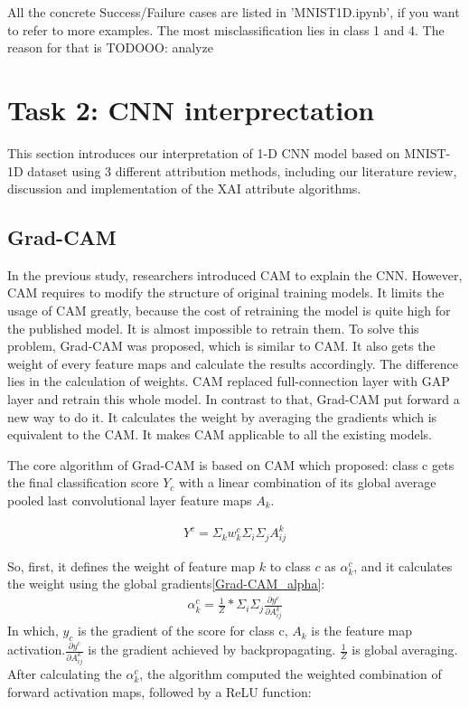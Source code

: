 \documentclass[conference]{IEEEtran}
\begin{document}
All the concrete Success/Failure cases are listed in 'MNIST1D.ipynb', if you want to refer to more examples.
The most misclassification lies in class 1 and 4.
The reason for that is TODOOO: analyze


\section{Task 2: CNN interprectation}

This section introduces our interpretation of 1-D CNN model based on MNIST-1D dataset using 3 different attribution methods, including our literature review, discussion and implementation of the XAI attribute algorithms.

\subsection{Grad-CAM}
In the previous study, researchers introduced CAM to explain the CNN. However, CAM requires to modify the structure of original training models. It limits the usage of CAM greatly, because the cost of retraining the model is quite high for the published model. It is almost impossible to retrain them.
To solve this problem, Grad-CAM was proposed, which is similar to CAM. It also gets the weight of every feature maps and calculate the results accordingly. The difference lies in the calculation of weights. CAM replaced full-connection layer with GAP layer and retrain this whole model. In contrast to that, Grad-CAM put forward a new way to do it.
It calculates the weight by averaging the gradients which is equivalent to the CAM. It makes CAM applicable to all the existing models.\par

The core algorithm of Grad-CAM is based on CAM which proposed: class c gets the final classification score $Y_{c}$ with a linear combination of its global average pooled last convolutional layer feature maps $A_{k}$.

\begin{equation}
    \begin{aligned}
        Y^{c}=\Sigma_{k}w_{k}^{c}\Sigma_{i}\Sigma_{j}A_{ij}^{k}
        \label{Grad-CAM_Y}
    \end{aligned}
  \end{equation}

So, first, it defines the weight of feature map $k$ to class $c$ as $\alpha_{k}^{c}$, and it calculates the weight using the global gradients\ref{Grad-CAM_alpha}:
\begin{equation}
    \begin{aligned}
        \alpha_{k}^{c}=\frac{1}{Z}*\Sigma_{i}\Sigma_{j}\frac{\partial y^{c}}{\partial A_{ij}^{k}}
        \label{Grad-CAM_alpha}
    \end{aligned}
  \end{equation}
  In which, $y_{c}$ is the gradient of the score for class c, $A_{k}$ is the feature map activation.$\frac{\partial y^{c}}{\partial A_{ij}^{k}}$ is the gradient achieved by backpropagating. $\frac{1}{Z}$ is global averaging.
  After calculating the $\alpha_{k}^{c}$, the algorithm computed the weighted combination of forward activation maps, followed by a ReLU function:
\end{document}
